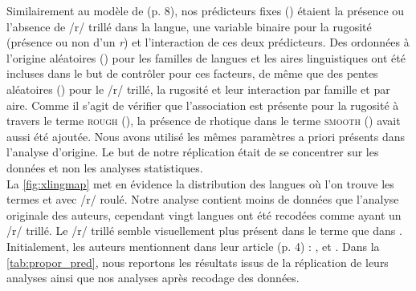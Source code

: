 Similairement au modèle de \citeauthor{winterTrilledAssociatedRoughness2022} (p. 8), nos prédicteurs fixes () étaient la présence ou l'absence de /r/ trillé dans la langue, une variable binaire pour la rugosité (présence ou non d'un \textit{r}) et l'interaction de ces deux prédicteurs. Des ordonnées à l'origine aléatoires () pour les familles de langues et les aires linguistiques ont été incluses dans le but de contrôler pour ces facteurs, de même que des pentes aléatoires () pour le /r/ trillé, la rugosité et leur interaction par famille et par aire. Comme il s'agit de vérifier que l'association est présente pour la rugosité à travers le terme \textsc{rough} (), la présence de rhotique dans le terme \textsc{smooth} () avait aussi été ajoutée. Nous avons utilisé les mêmes paramètres a priori présents dans l'analyse d'origine. Le but de notre réplication était de se concentrer sur les données et non les analyses statistiques.\\

La \autoref{fig:xlingmap} met en évidence la distribution des langues où l'on trouve les termes  et  avec /r/ roulé. Notre analyse contient moins de données que l'analyse originale des auteurs, cependant vingt langues ont été recodées comme ayant un /r/ trillé. Le /r/ trillé semble visuellement plus présent dans le terme  que dans .\\

Initialement, les auteurs mentionnent dans leur article (p. 4) : , et . Dans la \autoref{tab:propor_pred}, nous reportons les résultats issus de la réplication de leurs analyses ainsi que nos analyses après recodage des données.\\

